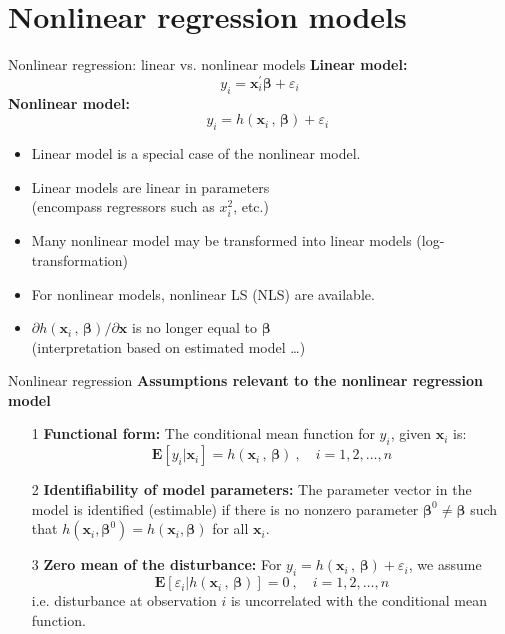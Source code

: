 \documentclass{beamer}
\begin{document}
\section{Nonlinear regression models}
\begin{frame}{Nonlinear regression: linear vs. nonlinear models}
\textbf{Linear model:}
$$
y_i = \bm{x}_i^{\prime}\bm{\beta} + \varepsilon_i
$$
\textbf{Nonlinear model:}
$$
~~~~~y_i = h(\bm{x}_i\, , \,\bm{\beta}) + \varepsilon_i
$$
\begin{itemize}
    \item Linear model is a special case of the nonlinear model.
    \item Linear models are linear in parameters \\(encompass regressors such as $x_i^2$, etc.)
    \item Many nonlinear model may be transformed into linear models (log-transformation)
    \item For nonlinear models, nonlinear LS (NLS) are available.
    \item $\partial h(\bm{x}_i\, , \,\bm{\beta})/\partial \bm{x}$ is no longer equal to $\bm\beta$ \\
    (interpretation based on estimated model \dots)
\end{itemize}
\end{frame}
\begin{frame}{Nonlinear regression}
\textbf{Assumptions relevant to the nonlinear regression model}\\
\begin{itemize}
 \item[1] \textbf{Functional form:} The conditional mean function for $y_i$, given $\bm{x}_i$ is: $$\mathbf{E}[y_i|\bm{x}_i] = h(\bm{x}_i\, , \,\bm{\beta})~, \quad i=1,2,\dots,n$$
 \item[2] \textbf{Identifiability of model parameters:} The parameter vector in the model is identified (estimable) if there is no nonzero parameter $\bm{\beta}^0 \neq \bm{\beta}$ such that $h(\bm{x}_i, \bm{\beta}^0)=h(\bm{x}_i, \bm{\beta})$ for all $\bm{x}_i$.
 \medskip
 \item[3] \textbf{Zero mean of the disturbance:} For $y_i = h(\bm{x}_i\, , \,\bm{\beta}) + \varepsilon_i$, we assume $$
 \mathbf{E}[\varepsilon_i| h(\bm{x}_i\, , \,\bm{\beta})] = 0~, \quad i=1,2,\dots,n
 $$
 i.e. disturbance at observation $i$ is uncorrelated with the conditional mean function.
\end{itemize}
\end{frame}
\end{document}
